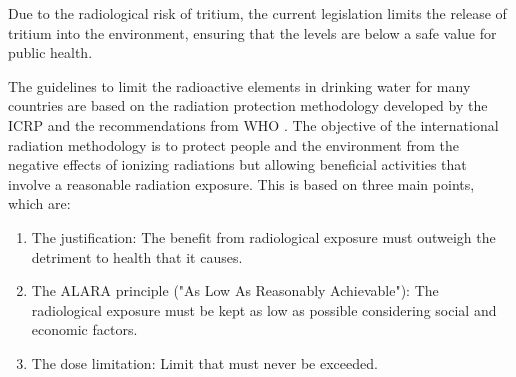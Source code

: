 Due to the radiological risk of tritium, the current legislation limits the release of tritium into the environment, ensuring that the levels are below a safe value for public health.

The guidelines to limit the radioactive elements in drinking water for many countries are based on the radiation protection methodology developed by the ICRP \cite{ICRP_GL} and the recommendations from WHO \cite{WHO_GL}. The objective of the international radiation methodology is to  protect people and the environment from the negative effects of ionizing radiations but allowing beneficial activities that involve a reasonable radiation exposure. This is based on three main points, which are:
\begin{enumerate}
\item{} The justification: The benefit from radiological exposure must outweigh the detriment to health that it causes.
\item{} The ALARA principle ("As Low As Reasonably Achievable"): The radiological exposure must be kept as low as possible considering social and economic factors.
\item{} The dose limitation: Limit that must never be exceeded.
\end{enumerate}


